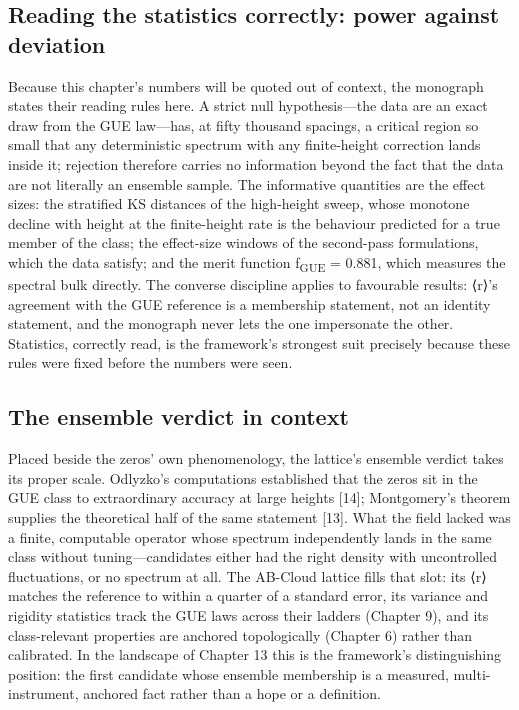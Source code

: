 \documentclass[10pt]{article}
\begin{document}
\subsection{Reading the statistics correctly: power against deviation}\label{sec:85}
Because this chapter's numbers will be quoted out of context, the monograph states their reading rules here. A strict null hypothesis---the data are an exact draw from the GUE law---has, at fifty thousand spacings, a critical region so small that any deterministic spectrum with any finite-height correction lands inside it; rejection therefore carries no information beyond the fact that the data are not literally an ensemble sample. The informative quantities are the effect sizes: the stratified KS distances of the high-height sweep, whose monotone decline with height at the finite-height rate is the behaviour predicted for a true member of the class; the effect-size windows of the second-pass formulations, which the data satisfy; and the merit function f\textsubscript{GUE} = 0.881, which measures the spectral bulk directly. The converse discipline applies to favourable results: ⟨r⟩'s agreement with the GUE reference is a membership statement, not an identity statement, and the monograph never lets the one impersonate the other. Statistics, correctly read, is the framework's strongest suit precisely because these rules were fixed before the numbers were seen.

\subsection{The ensemble verdict in context}\label{sec:86}
Placed beside the zeros' own phenomenology, the lattice's ensemble verdict takes its proper scale. Odlyzko's computations established that the zeros sit in the GUE class to extraordinary accuracy at large heights [14]; Montgomery's theorem supplies the theoretical half of the same statement [13]. What the field lacked was a finite, computable operator whose spectrum independently lands in the same class without tuning---candidates either had the right density with uncontrolled fluctuations, or no spectrum at all. The AB-Cloud lattice fills that slot: its ⟨r⟩ matches the reference to within a quarter of a standard error, its variance and rigidity statistics track the GUE laws across their ladders (Chapter 9), and its class-relevant properties are anchored topologically (Chapter 6) rather than calibrated. In the landscape of Chapter 13 this is the framework's distinguishing position: the first candidate whose ensemble membership is a measured, multi-instrument, anchored fact rather than a hope or a definition.
\end{document}
